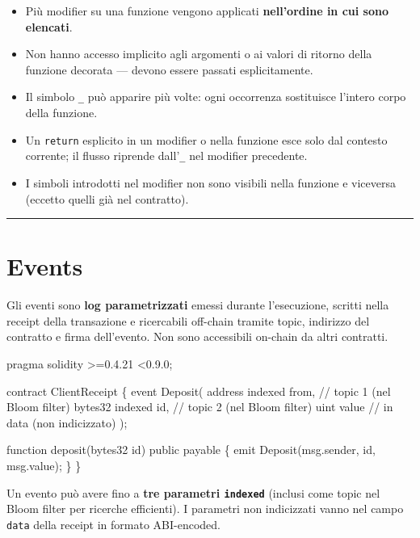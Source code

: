 \documentclass[
  italian,
  openany]{book}
\newenvironment{Shaded}{\begin{snugshade}}{\end{snugshade}}
\newcommand{\NormalTok}[1]{#1}
\providecommand{\tightlist}{%
  \setlength{\itemsep}{0pt}\setlength{\parskip}{0pt}}
\begin{document}
\begin{itemize}
\tightlist
\item
  Più modifier su una funzione vengono applicati \textbf{nell'ordine in
  cui sono elencati}.
\item
  Non hanno accesso implicito agli argomenti o ai valori di ritorno
  della funzione decorata --- devono essere passati esplicitamente.
\item
  Il simbolo \texttt{\_} può apparire più volte: ogni occorrenza
  sostituisce l'intero corpo della funzione.
\item
  Un \texttt{return} esplicito in un modifier o nella funzione esce solo
  dal contesto corrente; il flusso riprende dall'\texttt{\_} nel
  modifier precedente.
\item
  I simboli introdotti nel modifier non sono visibili nella funzione e
  viceversa (eccetto quelli già nel contratto).
\end{itemize}

\begin{center}\rule{0.5\linewidth}{0.5pt}\end{center}

\section{Events}\label{events}

Gli eventi sono \textbf{log parametrizzati} emessi durante l'esecuzione,
scritti nella receipt della transazione e ricercabili off-chain tramite
topic, indirizzo del contratto e firma dell'evento. Non sono accessibili
on-chain da altri contratti.

\begin{Shaded}
\begin{Highlighting}[]
\NormalTok{pragma solidity \textgreater{}=0.4.21 \textless{}0.9.0;}

\NormalTok{contract ClientReceipt \{}
\NormalTok{    event Deposit(}
\NormalTok{        address indexed from,   // topic 1 (nel Bloom filter)}
\NormalTok{        bytes32 indexed id,     // topic 2 (nel Bloom filter)}
\NormalTok{        uint value              // in data (non indicizzato)}
\NormalTok{    );}

\NormalTok{    function deposit(bytes32 id) public payable \{}
\NormalTok{        emit Deposit(msg.sender, id, msg.value);}
\NormalTok{    \}}
\NormalTok{\}}
\end{Highlighting}
\end{Shaded}

Un evento può avere fino a \textbf{tre parametri \texttt{indexed}}
(inclusi come topic nel Bloom filter per ricerche efficienti). I
parametri non indicizzati vanno nel campo \texttt{data} della receipt in
formato ABI-encoded.
\end{document}
